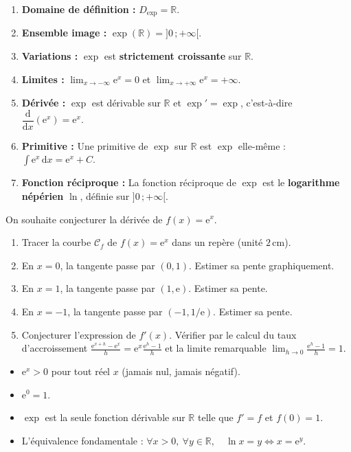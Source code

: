 \documentclass[11pt]{article}
\begin{document}
\begin{propriete}
\begin{enumerate}
\item \textbf{Domaine de définition :} $D_{\exp} = \mathbb{R}$.
\item \textbf{Ensemble image :} $\exp(\mathbb{R}) = ]0\,;+\infty[$.
\item \textbf{Variations :} $\exp$ est \textbf{strictement croissante} sur $\mathbb{R}$.
\item \textbf{Limites :} $\displaystyle\lim_{x\to -\infty}\mathrm{e}^{x}=0$ et $\displaystyle\lim_{x\to +\infty}\mathrm{e}^{x}=+\infty$.
\item \textbf{Dérivée :} $\exp$ est dérivable sur $\mathbb{R}$ et $\exp' = \exp$, c'est-à-dire $\dfrac{\mathrm{d}}{\mathrm{d}x}(\mathrm{e}^{x}) = \mathrm{e}^{x}$.
\item \textbf{Primitive :} Une primitive de $\exp$ sur $\mathbb{R}$ est $\exp$ elle-même : $\displaystyle\int \mathrm{e}^{x}\,\mathrm{d}x = \mathrm{e}^{x} + C$.
\item \textbf{Fonction réciproque :} La fonction réciproque de $\exp$ est le \textbf{logarithme népérien} $\ln$, définie sur $]0\,;+\infty[$.
\end{enumerate}
\end{propriete}

\begin{experience}
On souhaite conjecturer la dérivée de $f(x)=\mathrm{e}^{x}$.
\begin{enumerate}
\item Tracer la courbe $\mathcal{C}_f$ de $f(x)=\mathrm{e}^{x}$ dans un repère (unité $2\,\text{cm}$).
\item En $x=0$, la tangente passe par $(0,1)$. Estimer sa pente graphiquement.
\item En $x=1$, la tangente passe par $(1,\mathrm{e})$. Estimer sa pente.
\item En $x=-1$, la tangente passe par $(-1,1/\mathrm{e})$. Estimer sa pente.
\item Conjecturer l'expression de $f'(x)$. Vérifier par le calcul du taux d'accroissement $\frac{\mathrm{e}^{x+h}-\mathrm{e}^{x}}{h} = \mathrm{e}^{x}\frac{\mathrm{e}^{h}-1}{h}$ et la limite remarquable $\lim_{h\to 0}\frac{\mathrm{e}^{h}-1}{h}=1$.
\end{enumerate}
\end{experience}

\begin{aretenir}
\begin{itemize}
\item $\mathrm{e}^{x} > 0$ pour tout réel $x$ (jamais nul, jamais négatif).
\item $\mathrm{e}^{0} = 1$.
\item $\exp$ est la seule fonction dérivable sur $\mathbb{R}$ telle que $f'=f$ et $f(0)=1$.
\item L'équivalence fondamentale : $\forall x>0,\ \forall y\in\mathbb{R},\quad \ln x = y \iff x = \mathrm{e}^{y}$.
\end{itemize}
\end{aretenir}
\end{document}
